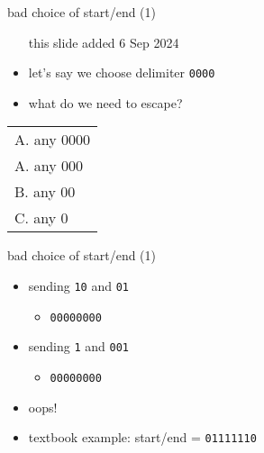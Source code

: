 \begin{frame}{bad choice of start/end (1)}
    \begin{itemize}
    \item [this slide added 6 Sep 2024]
    \item let's say we choose delimiter \texttt{0000}
    \item what do we need to escape?
    \end{itemize}
\begin{tabular}{l}
A. any 0000 \\
A. any 000 \\
B. any 00 \\
C. any 0 \\
\end{tabular}
\end{frame}

\begin{frame}{bad choice of start/end (1)}
    \begin{itemize}
    \item sending \texttt{10} and \texttt{01}
        \begin{itemize}
        \item {\tt {}00000000}
        \end{itemize}
    \item sending \texttt{1} and \texttt{001}
        \begin{itemize}
        \item {\tt {}00000000}
        \end{itemize}
    \vspace{.5cm}
    \item oops!
    \item textbook example: start/end = {\tt 01111110}
    \end{itemize}
\end{frame}

